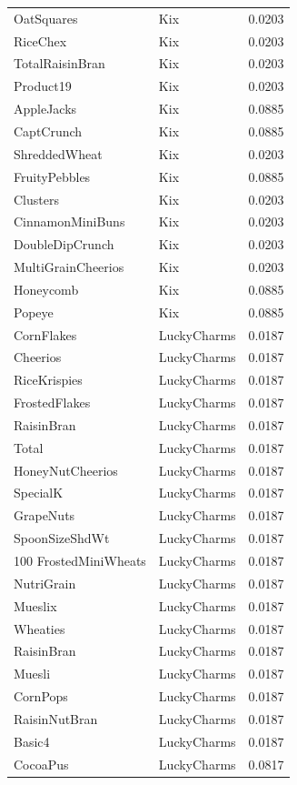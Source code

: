 \begin{longtable}{llr}
OatSquares & Kix & 0.0203 \\
RiceChex & Kix & 0.0203 \\
TotalRaisinBran & Kix & 0.0203 \\
Product19 & Kix & 0.0203 \\
AppleJacks & Kix & 0.0885 \\
CaptCrunch & Kix & 0.0885 \\
ShreddedWheat & Kix & 0.0203 \\
FruityPebbles & Kix & 0.0885 \\
Clusters & Kix & 0.0203 \\
CinnamonMiniBuns & Kix & 0.0203 \\
DoubleDipCrunch & Kix & 0.0203 \\
MultiGrainCheerios & Kix & 0.0203 \\
Honeycomb & Kix & 0.0885 \\
Popeye & Kix & 0.0885 \\
CornFlakes & LuckyCharms & 0.0187 \\
Cheerios & LuckyCharms & 0.0187 \\
RiceKrispies & LuckyCharms & 0.0187 \\
FrostedFlakes & LuckyCharms & 0.0187 \\
RaisinBran & LuckyCharms & 0.0187 \\
Total & LuckyCharms & 0.0187 \\
HoneyNutCheerios & LuckyCharms & 0.0187 \\
SpecialK & LuckyCharms & 0.0187 \\
GrapeNuts & LuckyCharms & 0.0187 \\
SpoonSizeShdWt & LuckyCharms & 0.0187 \\
100%
FrostedMiniWheats & LuckyCharms & 0.0187 \\
NutriGrain & LuckyCharms & 0.0187 \\
Mueslix & LuckyCharms & 0.0187 \\
Wheaties & LuckyCharms & 0.0187 \\
RaisinBran & LuckyCharms & 0.0187 \\
Muesli & LuckyCharms & 0.0187 \\
CornPops & LuckyCharms & 0.0187 \\
RaisinNutBran & LuckyCharms & 0.0187 \\
Basic4 & LuckyCharms & 0.0187 \\
CocoaPus & LuckyCharms & 0.0817 \\

\end{longtable}
